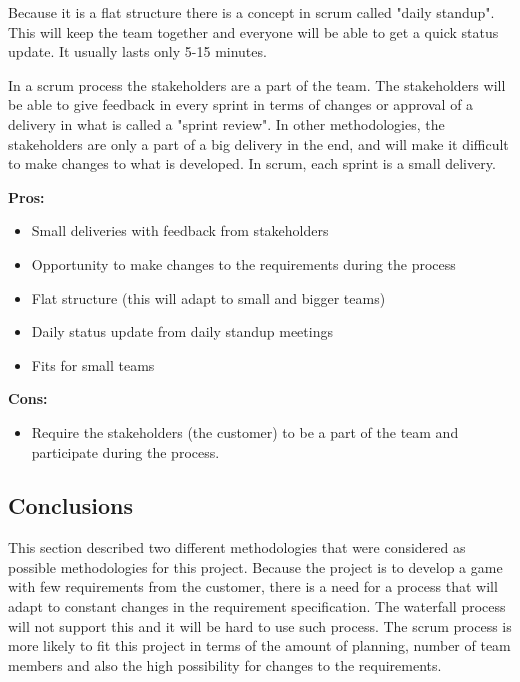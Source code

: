 Because it is a flat structure there is a concept in scrum called "daily standup". This will keep the team together and everyone will be able to get a quick status update. It usually lasts only 5-15 minutes. 

In a scrum process the stakeholders are a part of the team. The stakeholders will be able to give
feedback in every sprint in terms of changes or approval of a delivery in what is called a "sprint review".
In other methodologies, the stakeholders are only a part of a big delivery in the end, and will 
make it difficult to make changes to what is developed. In scrum, each sprint is a small delivery.

{\bf Pros: }
\begin{itemize}
	\item Small deliveries with feedback from stakeholders
	\item Opportunity to make changes to the requirements during the process
	\item Flat structure (this will adapt to small and bigger teams)
	\item Daily status update from daily standup meetings
	\item Fits for small teams
\end{itemize}

{\bf Cons: }
\begin{itemize}
	\item Require the stakeholders (the customer) to be a part of the team and participate during the process.
\end{itemize}

\subsection{Conclusions}
This section described two different methodologies that were considered as possible methodologies for this project. Because the project is to develop a game with few requirements from the customer, there is a need for a process that will adapt to constant changes in the requirement specification. The waterfall process will not support this and it will be hard to use such process. The scrum process is more likely to fit this project in terms of the amount of planning, 
number of team members and also the high possibility for changes to the requirements.



